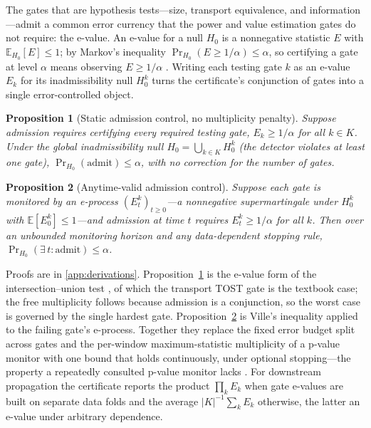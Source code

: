 \documentclass[3p]{elsarticle}
\newtheorem{proposition}{Proposition}
\begin{document}
The gates that are hypothesis tests---size, transport equivalence, and
information---admit a common error currency that the power and value
estimation gates do not require: the e-value. An e-value for a null $H_0$ is
a nonnegative statistic $E$ with $\mathbb{E}_{H_0}[E]\le 1$; by Markov's
inequality $\Pr_{H_0}(E\ge 1/\alpha)\le\alpha$, so certifying a gate at level
$\alpha$ means observing $E\ge 1/\alpha$ \citep{VovkWang2021,GrunwaldHeideCanonne2024}.
Writing each testing gate $k$ as an e-value $E_k$ for its inadmissibility
null $H_0^k$ turns the certificate's conjunction of gates into a single
error-controlled object.

\begin{proposition}[Static admission control, no multiplicity penalty]
\label{prop:static-e}
Suppose admission requires certifying every required testing gate,
$E_k\ge 1/\alpha$ for all $k\in K$. Under the global inadmissibility null
$H_0=\bigcup_{k\in K} H_0^k$ (the detector violates at least one gate),
$\Pr_{H_0}(\text{admit})\le\alpha$, with no correction for the number of
gates.
\end{proposition}

\begin{proposition}[Anytime-valid admission control]
\label{prop:online-e}
Suppose each gate is monitored by an e-process $(E^k_t)_{t\ge0}$---a
nonnegative supermartingale under $H_0^k$ with $\mathbb{E}[E^k_0]\le1$---and
admission at time $t$ requires $E^k_t\ge1/\alpha$ for all $k$. Then over an
unbounded monitoring horizon and any data-dependent stopping rule,
$\Pr_{H_0}(\exists\, t:\text{admit})\le\alpha$.
\end{proposition}

Proofs are in \ref{app:derivations}. Proposition~\ref{prop:static-e} is the
e-value form of the intersection--union test \citep{Berger1982}, of which the
transport TOST gate is the textbook case; the free multiplicity follows
because admission is a conjunction, so the worst case is governed by the
single hardest gate. Proposition~\ref{prop:online-e} is Ville's inequality
applied to the failing gate's e-process. Together they replace the fixed
error budget split across gates and the per-window maximum-statistic
multiplicity of a p-value monitor with one bound that holds continuously,
under optional stopping---the property a repeatedly consulted p-value monitor
lacks \citep{Ramdas2023}. For downstream propagation the certificate reports
the product $\prod_k E_k$ when gate e-values are built on separate data folds
and the average $|K|^{-1}\sum_k E_k$ otherwise, the latter an e-value under
arbitrary dependence.
\end{document}
